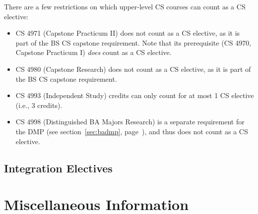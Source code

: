 \documentclass[10pt,letter,twocolumn]{book}
\newenvironment{itemlist}{
\begin{itemize}
\setlength{\itemsep}{0pt}
\setlength{\parskip}{0pt}}
{\end{itemize}}
\newenvironment{numlist}{
\begin{enumerate}
\setlength{\itemsep}{0pt}
\setlength{\parskip}{0pt}}
{\end{enumerate}}
\newcommand{\mysection}[1]{\section{#1}\renewcommand{\rightmark}{#1}}
\begin{document}
There are a few restrictions on which upper-level CS courses can count
as a CS elective:

\begin{itemlist}
\item CS 4971 (Capstone Practicum II) does not count as a CS elective,
as it is part of the BS CS capstone requirement.  Note that its
prerequisite (CS 4970, Capstone Practicum I) {\em does} count as a CS
elective.
\item CS 4980 (Capstone Research) does not count as a CS elective, as
it is part of the BS CS capstone requirement.
\item CS 4993 (Independent Study) credits can only count for at most 1
CS elective (i.e., 3 credits).
\item CS 4998 (Distinguished BA Majors Research) is a separate
  requirement for the DMP (see section~\ref{sec:badmp},
  page~\pageref{sec:badmp}), and thus does not count as a CS elective.
\end{itemlist}

\subsection{Integration Electives}
\label{sec:bacs-integrationelectives}




\mysection{Miscellaneous Information}


%
%
%
%
%
%
\end{document}
